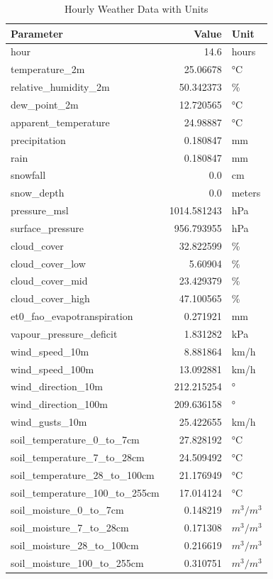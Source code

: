 \begin{table}[H]
	\centering
	\begin{tabular}{lrl}
		\toprule
		Parameter & Value & Unit \\
		\midrule
		hour &  14.6 & hours \\
		temperature\_2m & 25.06678 & °C \\
		relative\_humidity\_2m & 50.342373 & \% \\
		dew\_point\_2m & 12.720565 & °C \\
		apparent\_temperature & 24.98887 & °C \\
		precipitation & 0.180847 & mm \\
		rain & 0.180847 & mm \\
		snowfall & 0.0 & cm \\
		snow\_depth & 0.0 & meters \\
		pressure\_msl & 1014.581243 & hPa \\
		surface\_pressure & 956.793955 & hPa \\
		cloud\_cover & 32.822599 & \% \\
		cloud\_cover\_low & 5.60904 & \% \\
		cloud\_cover\_mid & 23.429379 & \% \\
		cloud\_cover\_high & 47.100565 & \% \\
		et0\_fao\_evapotranspiration & 0.271921 & mm \\
		vapour\_pressure\_deficit & 1.831282 & kPa \\
		wind\_speed\_10m & 8.881864 & km/h \\
		wind\_speed\_100m & 13.092881 & km/h \\
		wind\_direction\_10m & 212.215254 & ° \\
		wind\_direction\_100m & 209.636158 & ° \\
		wind\_gusts\_10m & 25.422655 & km/h \\
		soil\_temperature\_0\_to\_7cm & 27.828192 & °C \\
		soil\_temperature\_7\_to\_28cm & 24.509492 & °C \\
		soil\_temperature\_28\_to\_100cm & 21.176949 & °C \\
		soil\_temperature\_100\_to\_255cm & 17.014124 & °C \\
		soil\_moisture\_0\_to\_7cm & 0.148219 & $m^3/m^3$ \\
		soil\_moisture\_7\_to\_28cm & 0.171308 & $m^3/m^3$ \\
		soil\_moisture\_28\_to\_100cm & 0.216619 & $m^3/m^3$ \\
		soil\_moisture\_100\_to\_255cm & 0.310751 & $m^3/m^3$ \\
		\bottomrule
	\end{tabular}
	\caption{Hourly Weather Data with Units}
	\label{tab:hourly_weather_data_units}
\end{table}


